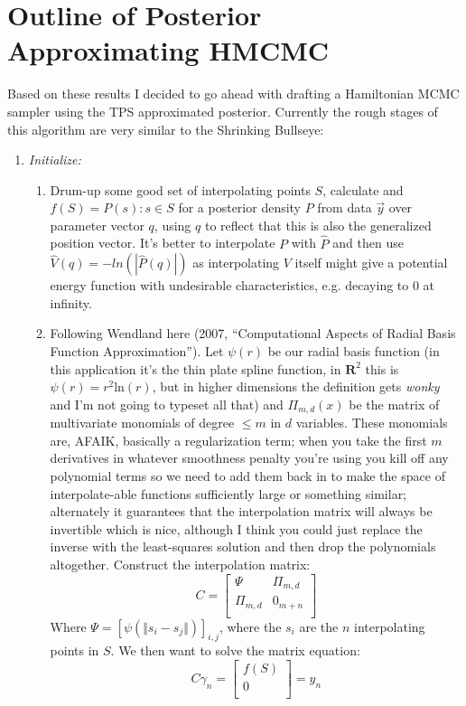 \documentclass[12pt,a4paper]{article}
\begin{document}
\section{Outline of Posterior Approximating HMCMC}
Based on these results I decided to go ahead with drafting a Hamiltonian MCMC sampler using the TPS approximated posterior.  Currently the rough stages of this algorithm are very similar to the Shrinking Bullseye:
\begin{enumerate}
\item \textit{Initialize:}
\begin{enumerate}
\item Drum-up some good set of interpolating points $S$, calculate and $f(S) = {P(s) : s \in S}$ for a posterior density $P$ from data $\vec{y}$ over parameter vector $q$, using $q$ to reflect that this is also the generalized position vector.  It's better to interpolate $P$ with $\hat{P}$ and then use $\hat{V}(q) = - ln(|\hat{P}(q)|)$ as interpolating $V$ itself might give a potential energy function with undesirable characteristics, e.g. decaying to 0 at infinity.
\item Following Wendland here (2007, ``Computational Aspects of Radial Basis Function Approximation''). Let $\psi(r)$ be our radial basis function (in this application it's the thin plate spline function, in $\mathbf{R}^2$ this is $\psi(r) = r^2 \text{ln}(r)$, but in higher dimensions the definition gets \textit{wonky} and I'm not going to typeset all that) and $\Pi_{m,d}(x)$ be the matrix of multivariate  monomials of degree $\leq m$ in $d$ variables.  These monomials are, AFAIK, basically a regularization term; when you take the first $m$ derivatives in whatever smoothness penalty you're using you kill off any polynomial terms so we need to add them back in to make the space of interpolate-able functions sufficiently large or something similar; alternately it guarantees that the interpolation matrix will always be invertible which is nice, although I think you could just replace the inverse with the least-squares solution and then drop the polynomials altogether.  Construct the interpolation matrix:
\[
C =  \left[ 
\begin{array}{cc}
\Psi & \Pi_{m,d}\\
\Pi_{m,d} & 0_{m+n}\\
\end{array}
\right]
\]
Where $\Psi = [\psi(\Vert s_i - s_j \Vert)]_{i,j}$, where the $s_i$ are the $n$ interpolating points in $S$.  We then want to solve the matrix equation:
\begin{equation}
C \gamma_n = \left[ \begin{array}{c} f(S)\\ 0\\ \end{array} \right] = y_n
\end{equation}


\end{enumerate}
\end{enumerate}
\end{document}

